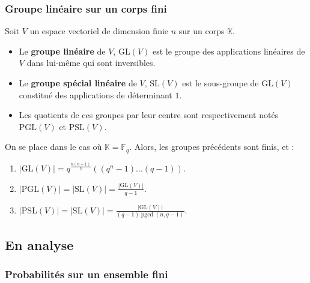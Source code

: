   \subsubsection{Groupe linéaire sur un corps fini}
  
  
  Soit $V$ un espace vectoriel de dimension finie $n$ sur un corps $\mathbb{K}$.
  
  \begin{definition}
    \begin{itemize}
      \item Le \textbf{groupe linéaire} de $V$, $\mathrm{GL}(V)$ est le groupe des applications linéaires de $V$ dans lui-même qui sont inversibles.
      \item Le \textbf{groupe spécial linéaire} de $V$, $\mathrm{SL}(V)$ est le sous-groupe de $\mathrm{GL}(V)$ constitué des applications de déterminant $1$.
      \item Les quotients de ces groupes par leur centre sont respectivement notés $\mathrm{PGL}(V)$ et $\mathrm{PSL}(V)$.
    \end{itemize}
  \end{definition}
  
  
  \begin{proposition}
    On se place dans le cas où $\mathbb{K} = \mathbb{F}_q$. Alors, les groupes précédents sont finis, et :
    \begin{enumerate}[label=(\roman*)]
      \item $|\mathrm{GL}(V)| = q^{\frac{n(n-1)}{2}}((q^n-1) \dots (q-1))$.
      \item $|\mathrm{PGL}(V)| = |\mathrm{SL}(V)| = \frac{|\mathrm{GL}(V)|}{q-1}$.
      \item $|\mathrm{PSL}(V)| = |\mathrm{SL}(V)| = \frac{|\mathrm{GL}(V)|}{(q-1)\operatorname{pgcd}(n,q-1)}$.
    \end{enumerate}
  \end{proposition}
  
  \subsection{En analyse}
  
  \subsubsection{Probabilités sur un ensemble fini}
  
